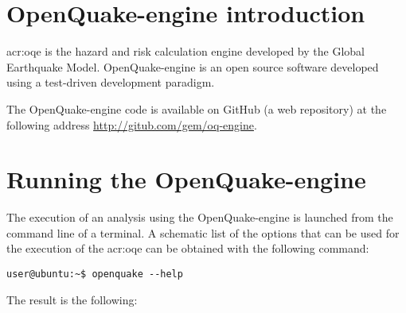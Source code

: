 \section{OpenQuake-engine introduction}
\gls{acr:oqe} is the hazard and risk calculation engine developed by
the Global Earthquake Model. OpenQuake-engine is an open source software
developed using a test-driven development paradigm. 

The OpenQuake-engine code is available on GitHub (a web repository)
at the following address \href{http://gitub.com/gem/oq-engine}{http://gitub.com/gem/oq-engine}.
\section{Running the OpenQuake-engine}
\label{sec:intro}
The execution of an analysis using the OpenQuake-engine is launched from 
the command line of a terminal. A schematic list of the options that 
can be used for the execution of the \gls{acr:oqe} can be obtained 
with the following command:
\begin{Verbatim}[frame=single, commandchars=\\\{\}, fontsize=\small]
user@ubuntu:~$ openquake --help
\end{Verbatim}
The result is the following:


